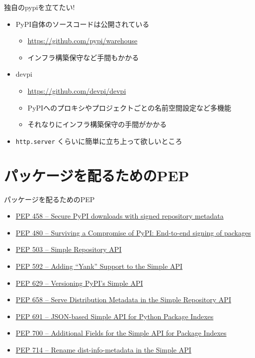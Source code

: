 \documentclass[presentation]{beamer}
\begin{document}
\begin{frame}[label={sec:org8f8becf},fragile]{独自のpypiを立てたい!}
 \begin{itemize}
\item PyPI自体のソースコードは公開されている
\begin{itemize}
\item \url{https://github.com/pypi/warehouse}
\item インフラ構築保守など手間もかかる
\end{itemize}
\item devpi
\begin{itemize}
\item \url{https://github.com/devpi/devpi}
\item PyPIへのプロキシやプロジェクトごとの名前空間設定など多機能
\item それなりにインフラ構築保守の手間がかかる
\end{itemize}
\item \texttt{http.server} くらいに簡単に立ち上って欲しいところ
\end{itemize}
\end{frame}

\section{パッケージを配るためのPEP}
\label{sec:org2502ba8}
\begin{frame}[label={sec:orgcc63fff}]{パッケージを配るためのPEP}
\begin{itemize}
\item \href{https://peps.python.org/pep-0458}{PEP 458 – Secure PyPI downloads with signed repository metadata}
\item \href{https://peps.python.org/pep-0480}{PEP 480 – Surviving a Compromise of PyPI: End-to-end signing of packages}
\item \href{https://peps.python.org/pep-0503/}{PEP 503 – Simple Repository API}
\item \href{https://peps.python.org/pep-0592}{PEP 592 – Adding “Yank” Support to the Simple API}
\item \href{https://peps.python.org/pep-0629}{PEP 629 – Versioning PyPI’s Simple API}
\item \href{https://peps.python.org/pep-0658}{PEP 658 – Serve Distribution Metadata in the Simple Repository API}
\item \href{https://peps.python.org/pep-0691}{PEP 691 – JSON-based Simple API for Python Package Indexes}
\item \href{https://peps.python.org/pep-0700}{PEP 700 – Additional Fields for the Simple API for Package Indexes}
\item \href{https://peps.python.org/pep-0714}{PEP 714 – Rename dist-info-metadata in the Simple API}
\end{itemize}
\end{frame}
\end{document}
